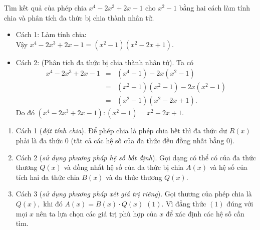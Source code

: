 \begin{vd} %
	Tìm kết quả của phép chia $x^4-2x^3+2x-1$ cho $x^2-1$ bằng hai cách làm tính chia và phân tích đa thức bị chia thành nhân tử.
	\loigiai
	{
			\begin{itemize}
				\item Cách 1: Làm tính chia:
				\\
				Vậy $x^4-2x^3+2x-1=(x^2-1)(x^2-2x+1).$
				\item  Cách 2: (Phân tích đa thức bị chia thành nhân tử). Ta có
				{\allowdisplaybreaks
				\begin{eqnarray*}
				x^4-2x^3+2x-1&=&(x^4-1)-2x(x^2-1)\\
				&=&(x^2+1)(x^2-1)-2x(x^2-1)\\
				&=&(x^2-1)(x^2-2x+1).
				\end{eqnarray*}
			Do đó $	(x^4-2x^3+2x-1):(x^2-1)=x^2-2x+1.$
		}
		\end{itemize}}
\end{vd}
\begin{dang}
	\begin{enumerate}[\tickEX]
		\item Cách 1 ({\it đặt tính chia}). Để phép chia là phép chia hết thì đa thức dư $R(x)$ phải là đa thức $0$ (tất cả các hệ số của đa thức đều đồng nhất bằng $0$).
		\item  Cách 2 ({\it sử dụng phương pháp hệ số bất định}). Gọi dạng có thể có của đa thức thương $Q(x)$ và đồng nhất hệ số của đa thức bị chia $A(x)$ và hệ số của tích hai đa thức chia $B(x)$ và đa thức thương $Q(x)$.
		\item Cách 3 ({\it sử dụng phương pháp xét giá trị riêng}). Gọi thương của phép chia là $Q(x),$ khi đó $A(x)=B(x)\cdot Q(x)$ \hfill$(1).$ Vì đẳng thức $(1)$ đúng với mọi $x$ nên ta lựa chọn các giá trị phù hợp của $x$ để xác định các hệ số cần tìm. 
	\end{enumerate}
\end{dang}
